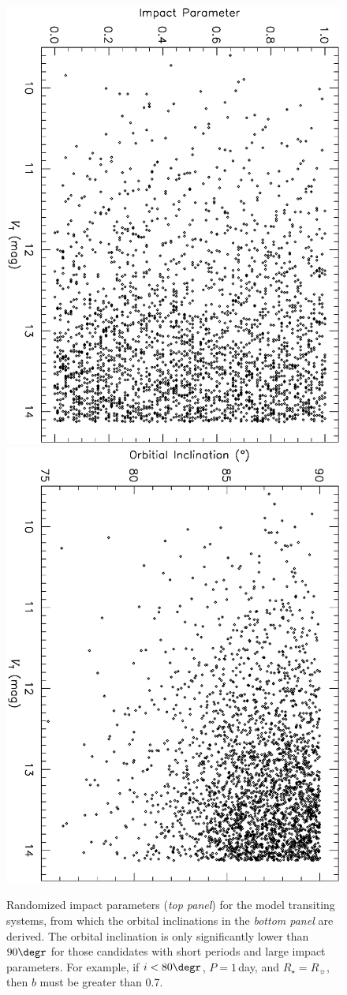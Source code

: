 \begin{figure}
\begin{center}
\centering
\includegraphics[width=.55\textwidth, angle=90]{7_orb_a}\\
\includegraphics[width=.55\textwidth, angle=90]{7_orb_b}\\
\caption[Randomized transit impact parameters and orbital inclinations]{%
Randomized impact parameters ({\it top panel}) for the model
transiting systems, from which the orbital inclinations in the {\it bottom panel} are derived.
The orbital inclination is only significantly lower than $90\degr$ for those candidates with short periods and large impact parameters. 
For example, if $i<80\degr$, $P=1$\,day, and $R_{\star}=R_{\sun}$, then $b$ must be greater than 0.7. %
}
\label{cha:human:sec:model:fig:orb}
\end{center}
\end{figure}

